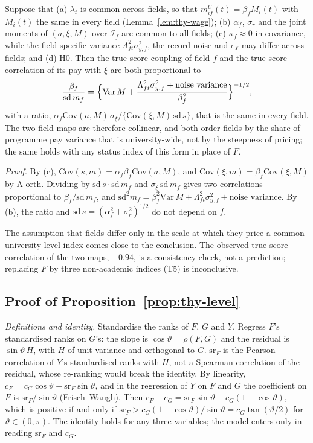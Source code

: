 \begin{thycor}\label{cor:thy-onefactor}
Suppose that (a) $\lambda_t$ is common across fields, so that $m^U_{if}(t)=\beta_fM_i(t)$ with $M_i(t)$ the
same in every field (Lemma~\ref{lem:thy-wage}); (b) $\alpha_f$, $\sigma_r$ and the joint moments of $(a,\xi,M)$ over $\mathcal I_f$
are common to all fields; (c) $\kappa_f\approx0$ in covariance, while the field-specific variance
$\Lambda_{ft}^2\sigma_{y,f}^2$, the record noise and $e_Y$ may differ across fields; and (d) H0. Then the true-score
coupling of field $f$ and the true-score correlation of its pay with $\xi$ are both proportional to
\[
\frac{\beta_f}{\mathrm{sd}\,m_f}=\Bigl\{\mathrm{Var}\,M+\frac{\Lambda_{ft}^2\sigma_{y,f}^2+\text{noise variance}}{\beta_f^2}\Bigr\}^{-1/2},
\]
with a ratio, $\alpha_f\mathrm{Cov}(a,M)\,\sigma_\xi/\{\mathrm{Cov}(\xi,M)\,\mathrm{sd}\,s\}$, that is the same in
every field. The two field maps are therefore collinear, and both order fields by the share of programme pay variance
that is university-wide, not by the steepness of pricing; the same holds with any status index of this form in place
of $F$.
\end{thycor}

\emph{Proof.} By (c), $\mathrm{Cov}(s,m)=\alpha_f\beta_f\mathrm{Cov}(a,M)$, and
$\mathrm{Cov}(\xi,m)=\beta_f\mathrm{Cov}(\xi,M)$ by A-orth. Dividing by $\mathrm{sd}\,s\cdot\mathrm{sd}\,m_f$ and
$\sigma_\xi\,\mathrm{sd}\,m_f$ gives two correlations proportional to $\beta_f/\mathrm{sd}\,m_f$, and
$\mathrm{sd}^2m_f=\beta_f^2\mathrm{Var}\,M+\Lambda_{ft}^2\sigma_{y,f}^2+\text{noise variance}$. By (b), the ratio and
$\mathrm{sd}\,s=(\alpha_f^2+\sigma_r^2)^{1/2}$ do not depend on $f$. \thyqed

The assumption that fields differ only in the scale at which they price a common university-level index comes close
to the conclusion. The observed true-score correlation of the two maps, $+0.94$, is a consistency check, not a
prediction; replacing $F$ by three non-academic indices (T5) is inconclusive.

\subsection{Proof of Proposition~\ref{prop:thy-level}}\label{app:thy:p2}

\emph{Definitions and identity.} Standardise the ranks of $F$, $G$ and $Y$. Regress $F$'s standardised ranks on
$G$'s: the slope is $\cos\vartheta=\rho(F,G)$ and the residual is $\sin\vartheta\,H$, with $H$ of unit variance and
orthogonal to $G$. $\mathrm{sr}_F$ is the Pearson correlation of $Y$'s standardised ranks with $H$, not a Spearman
correlation of the residual, whose re-ranking would break the identity. By linearity,
$c_F=c_G\cos\vartheta+\mathrm{sr}_F\sin\vartheta$, and in the regression of $Y$ on $F$ and $G$ the coefficient on $F$
is $\mathrm{sr}_F/\sin\vartheta$ (Frisch--Waugh). Then $c_F-c_G=\mathrm{sr}_F\sin\vartheta-c_G(1-\cos\vartheta)$, which
is positive if and only if $\mathrm{sr}_F>c_G(1-\cos\vartheta)/\sin\vartheta=c_G\tan(\vartheta/2)$ for
$\vartheta\in(0,\pi)$. The identity holds for any three variables; the model enters only in reading $\mathrm{sr}_F$
and $c_G$.


